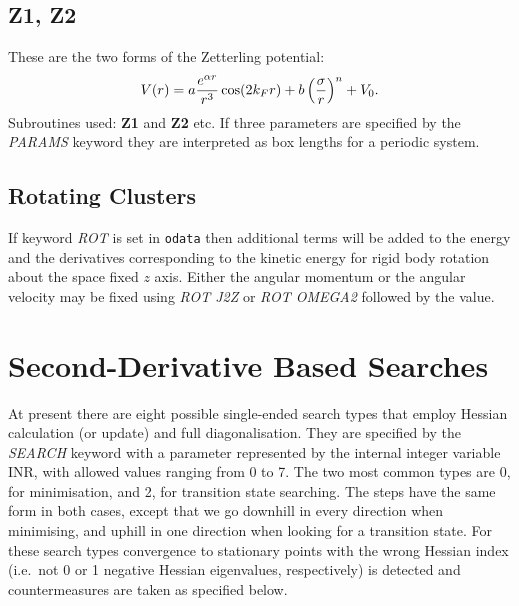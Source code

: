 \documentclass[12pt,a4paper,dvips]{article}
\begin{document}
\subsection{Z1, Z2}These are the two forms of the Zetterling potential:\cite{DoyeWZD03}
\begin{equation}
V(r)=a {e^{\alpha r}\over r^3} \cos(2k_F r)+b\left({\sigma\over r}\right)^{n}+V_0.
\end{equation}
Subroutines used: {\bf Z1} and {\bf Z2} etc.
If three parameters are specified by the {\it PARAMS\/} keyword they are interpreted 
as box lengths for a periodic system.


\subsection{Rotating Clusters}If keyword {\it ROT\/} is set in 
{\tt odata} then additional terms will be added to the
energy and the derivatives corresponding to the kinetic energy for rigid body rotation
about the space fixed $z$ axis. Either the angular momentum or the angular velocity
may be fixed using {\it ROT J2Z\/} or {\it ROT OMEGA2\/} followed by the value.

\section{Second-Derivative Based Searches}
\label{sec:second}
At present there are eight possible single-ended search types 
that employ Hessian calculation (or update) and full diagonalisation. They are specified by
the {\it SEARCH\/} keyword with a parameter 
represented by the internal integer variable INR, with allowed values ranging from 0 to 7. 
The two most common
types are 0, for minimisation, and 2, for transition state searching. The steps have
the same form in both cases,\cite{wales94a} except that we go downhill in every direction when
minimising, and uphill in one direction when looking for a transition state. For these
search types convergence to stationary points with the wrong Hessian index (i.e.~not
0 or 1 negative Hessian eigenvalues, respectively) is detected and countermeasures are
taken as specified below. 
\end{document}
